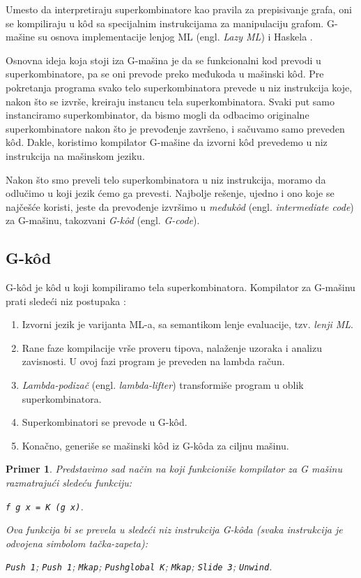 \documentclass[a4paper]{article}
\newtheorem{primer}{Primer}[section]
\begin{document}
Umesto da interpretiraju superkombinatore kao pravila za prepisivanje grafa, oni se kompiliraju u k\^ od sa specijalnim instrukcijama za manipulaciju grafom. G-mašine su osnova implementacije lenjog ML (engl. \textit{Lazy ML}) \cite{lazy-ML} i Haskela \cite{hbc}. 

Osnovna ideja koja stoji iza G-mašina je da se funkcionalni kod prevodi u superkombinatore, pa se oni prevode preko međukoda u mašinski k\^ od. Pre pokretanja programa svako telo superkombinatora prevede u niz instrukcija koje, nakon što se izvrše, kreiraju instancu tela superkombinatora. Svaki put samo instanciramo superkombinator, da bismo mogli da odbacimo originalne superkombinatore nakon što je prevođenje završeno, i sačuvamo samo preveden k\^ od. Dakle, koristimo kompilator G-mašine da izvorni k\^ od prevedemo u niz instrukcija na mašinskom jeziku.

Nakon što smo preveli telo superkombinatora u niz instrukcija, moramo da odlučimo u koji jezik ćemo ga prevesti. Najbolje rešenje, ujedno i ono koje se najčešće koristi, jeste da prevođenje izvršimo u \textit{međuk\^ od} (engl. \textit{intermediate code}) za G-mašinu, takozvani {\em G-k\^ od} (engl. \textit{G-code}).

\subsection{G-k\^ od}

G-k\^ od je k\^ od u koji kompiliramo tela superkombinatora. Kompilator za G-mašinu prati sledeći niz postupaka \cite{the-implementation-of-functional-programming-languages, abstract-machines}:

\begin{enumerate}
	\item Izvorni jezik je varijanta ML-a, sa semantikom lenje evaluacije, tzv. {\em lenji ML}.
	\item Rane faze kompilacije vrše proveru tipova, nalaženje uzoraka i analizu zavisnosti. U ovoj fazi program je preveden na lambda račun.
	\item \textit{Lambda-podizač} (engl. \textit{lambda-lifter}) transformiše program u oblik superkombinatora.   
	\item Superkombinatori se prevode u G-k\^ od.
	\item Konačno, generiše se mašinski k\^ od iz G-k\^ oda za ciljnu mašinu.
\end{enumerate}


\begin{primer}
	Predstavimo sad način na koji funkcioniše kompilator za G mašinu razmatrajući sledeću funkciju:
	\begin{center}
		\verb|f g x = K (g x)|.
	\end{center}
	Ova funkcija bi se prevela u sledeći niz instrukcija G-k\^ oda (svaka instrukcija je odvojena simbolom tačka-zapeta):
	\begin{center}
		\verb|Push 1|; \verb|Push 1|; \verb|Mkap|; \verb|Pushglobal K|; \verb|Mkap|; \verb|Slide 3|; \verb|Unwind|.
	\end{center}
\end{primer}
\end{document}
